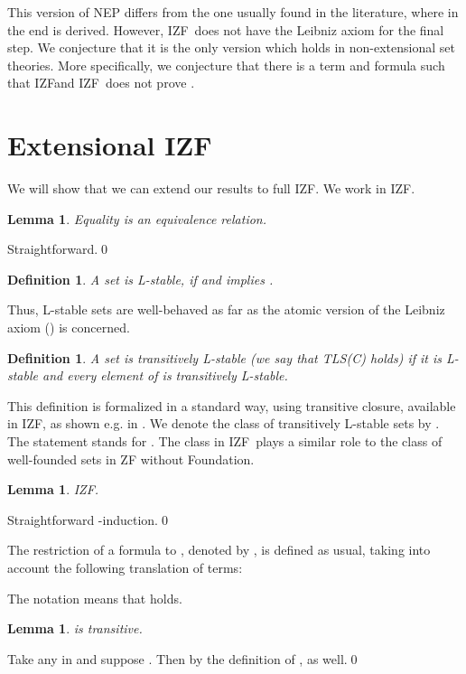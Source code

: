 \documentclass{LMCS}
\newtheorem{definition}[thm]{Definition}
\newtheorem{lemma}[thm]{Lemma}
\newcommand{\izfr}{IZF}
\newcommand{\iizfr}{IZF}
\begin{document}
This version of NEP differs from the one usually found in the literature,
where in the end  is derived. However, \iizfr\ does not have the
Leibniz axiom for the final step. We conjecture that it is the only version
which holds in non-extensional set theories. More specifically, we
conjecture that there is a term  and formula  such that \iizfr  and \iizfr\ does not prove . 

\section{Extensional \izfr}\label{lei}

We will show that we can extend our results to full \izfr. We work in \iizfr.

\begin{lemma}
Equality is an equivalence relation.
\end{lemma}
\proof Straightforward.\qed


\begin{definition}
A set  is \emph{L-stable}, if  and  implies . 
\end{definition}

Thus, L-stable sets are well-behaved as far as the atomic version of the
Leibniz axiom () is concerned. 

\begin{definition}
A set  is \emph{transitively L-stable} (we say that TLS(C) holds) if it is L-stable and every
element of  is transitively L-stable. 
\end{definition}

This definition is formalized in a standard way, using transitive closure, available
in \iizfr, as shown e.g. in \cite{ar}. We denote the class of transitively L-stable sets
by . The statement  stands for . The class  in
\iizfr\ plays a similar role to the class of well-founded sets in ZF without
Foundation. 

\begin{lemma}
\izfr . 
\end{lemma}
\proof Straightforward -induction.\qed


The restriction of a formula  to , denoted by , is defined
as usual, taking into account the following translation of terms:


The notation  means that  holds. 
\begin{lemma}
 is transitive. 
\end{lemma}
\proof Take any  in  and suppose . Then by the definition of ,  as well.\qed
\end{document}
